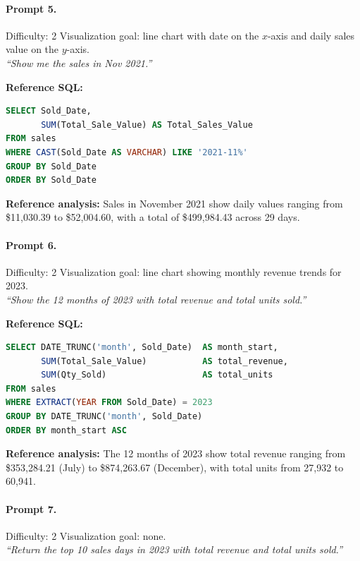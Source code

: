 \paragraph{Prompt 5.}
Difficulty: 2 \quad Visualization goal: line chart with date on the $x$-axis and daily sales value on the $y$-axis.\\[2pt]
\textit{``Show me the sales in Nov 2021.''}

\textbf{Reference SQL:}
\begin{lstlisting}[language=SQL]
SELECT Sold_Date,
       SUM(Total_Sale_Value) AS Total_Sales_Value
FROM sales
WHERE CAST(Sold_Date AS VARCHAR) LIKE '2021-11%'
GROUP BY Sold_Date
ORDER BY Sold_Date
\end{lstlisting}

\textbf{Reference analysis:}
Sales in November 2021 show daily values ranging from \$11,030.39 to \$52,004.60,
with a total of \$499,984.43 across 29 days.

\bigskip

\paragraph{Prompt 6.}
Difficulty: 2 \quad Visualization goal: line chart showing monthly revenue trends for 2023.\\[2pt]
\textit{``Show the 12 months of 2023 with total revenue and total units sold.''}

\textbf{Reference SQL:}
\begin{lstlisting}[language=SQL]
SELECT DATE_TRUNC('month', Sold_Date)  AS month_start,
       SUM(Total_Sale_Value)           AS total_revenue,
       SUM(Qty_Sold)                   AS total_units
FROM sales
WHERE EXTRACT(YEAR FROM Sold_Date) = 2023
GROUP BY DATE_TRUNC('month', Sold_Date)
ORDER BY month_start ASC
\end{lstlisting}

\textbf{Reference analysis:}
The 12 months of 2023 show total revenue ranging from \$353,284.21 (July) to
\$874,263.67 (December), with total units from 27,932 to 60,941.

\bigskip

\paragraph{Prompt 7.}
Difficulty: 2 \quad Visualization goal: none.\\[2pt]
\textit{``Return the top 10 sales days in 2023 with total revenue and total units sold.''}

